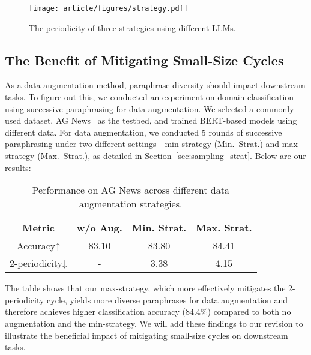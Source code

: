 \begin{figure}[h]
    \centering
    \texttt{[image: article/figures/strategy.pdf]}
    \caption{The periodicity of three strategies using different LLMs. } 
    \label{figs:strategy}
\end{figure}

\subsection{The Benefit of Mitigating Small-Size Cycles}
As a data augmentation method, paraphrase diversity should impact downstream tasks.
To figure out this, we conducted an experiment on domain classification using successive paraphrasing for data augmentation. We selected a commonly used dataset, AG News~\cite{zhang2016characterlevelconvolutionalnetworkstext} as the testbed, and trained BERT-based models using different data. For data augmentation, we conducted 5 rounds of successive paraphrasing under two different settings—min-strategy (Min.~Strat.) and max-strategy (Max.~Strat.), as detailed in Section~\ref{sec:sampling_strat}. Below are our results:

\begin{table}[h]
\centering
\small
\begin{tabular}{cccc}
\toprule
\textbf{Metric} & \textbf{w/o Aug.} & \textbf{Min. Strat.} & \textbf{ Max. Strat.} \\ \midrule
    Accuracy↑                       & 83.10        & 83.80        & 84.41        \\ 
2-periodicity↓    &       -     & 3.38          & 4.15          \\ \bottomrule
\end{tabular}
\caption{Performance on AG News across different data augmentation strategies.}
\end{table}

The table shows that our max-strategy, which more effectively mitigates the 2-periodicity cycle, yields more diverse paraphrases for data augmentation and therefore achieves higher classification accuracy (84.4\%) compared to both no augmentation and the min-strategy. We will add these findings to our revision to illustrate the beneficial impact of mitigating small-size cycles on downstream tasks.